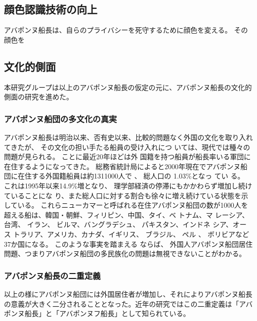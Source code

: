 \documentclass[12pt]{jsarticle}
\begin{document}
\subsection{顔色認識技術の向上}
アバポンヌ船長は、自らのプライバシーを死守するために顔色を変える。
その顔色を

\subsection{文化的側面}
本研究グループは以上のアバポンヌ船長の仮定の元に、アバポンヌ船長の文化的側面の研究を進めた。

\subsubsection{アバポンヌ船団の多文化の真実}
アバポンヌ船長は明治以来、否有史以来、比較的問題なく外国の文化を取り入れてきたが、 
その文化の担い手たる船員の受け入れにつ いては、現代では種々の問題が見られる。 
ことに最近20年ほどは外 国籍を持つ船員が船長率いる軍団に在住するようになってきた。 
総務省統計局によると2000年現在でアバポンヌ船団に在住する外国籍船員は約1311000人で 、
総人口の 1.03\%となっ てい る。 
これは1995年以来14.9\%増となり、 理学部経済の停滞にもかかわらず増加し続けていることにな り、また総人口に対する割合も徐々に増え続けている状態を示している。 
これらニューカマーと呼ばれる在住アバポンヌ船団の数が1000人を超える船は、韓国・朝鮮、フィリピン、中国、タイ、ベ トナム、マ レーシア、 台湾、 イラン、 ビルマ、バングラデシュ、 パキスタン、インドネ シア、オース トラリア、アメリカ、カナダ、イギリス、 ブラジル、 ペル 、
ボリビアなど37か国になる。 
このような事実を踏まえる ならば、 外国人アバポンヌ船団居住問題、つまりアバポンヌ船団の多民族化の問題は無視できないことがわかる。 

\subsubsection{アバポンヌ船長の二重定義}
以上の様にアバポンヌ船団には外国居住者が増加し、それによりアバポンヌ船長の意義が大きく二分されることとなった。近年の研究ではこの二重定義は「アバポンヌ船長」と「アバポンヌフ船長」として知られている。

\end{document}
